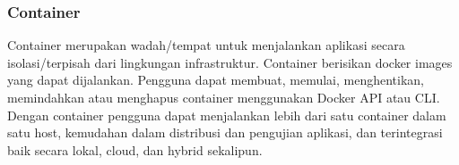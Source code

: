 \subsubsection{Container}

Container merupakan wadah/tempat untuk menjalankan aplikasi secara isolasi/terpisah dari lingkungan infrastruktur. Container berisikan 
docker images yang dapat dijalankan. Pengguna dapat membuat, memulai, menghentikan, memindahkan atau menghapus container menggunakan 
Docker API atau CLI. Dengan container pengguna dapat menjalankan lebih dari satu container dalam satu host, kemudahan dalam distribusi 
dan pengujian aplikasi, dan terintegrasi baik secara lokal, cloud, dan hybrid sekalipun.